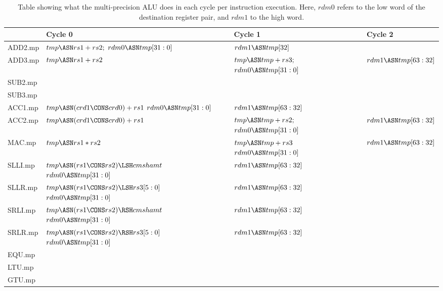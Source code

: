 \documentclass{article}
\begin{document}
\begin{table}[H]
\begin{tabularx}{\textwidth}{l Y Y Y }
\toprule
\textbf{}& \textbf{Cycle 0}& \textbf{Cycle 1}& \textbf{Cycle 2} \\
\midrule
ADD2.mp&
    $tmp \ASN rs1+rs2;$\newline 
    $rdm0\ASN tmp[31:0]$ 
 &  $rdm1\ASN tmp[32]$ 
 & \\
ADD3.mp&
   $tmp \ASN rs1 + rs2$
 & $tmp \ASN tmp + rs3;$\newline
   $rdm0\ASN tmp[31:0]$ 
 & $rdm1\ASN tmp[63:32]$ 
\\
SUB2.mp&
 &
 &
\\
SUB3.mp&
 &
 &
\\
ACC1.mp&
    $tmp \ASN (crd1 \CONS crd0) + rs1$\newline 
    $rdm0\ASN tmp[31:0]$ 
 &  $rdm1\ASN tmp[63:32]$ 
 &
\\
ACC2.mp&
    $tmp \ASN (crd1 \CONS crd0) + rs1$\newline 
 &  $tmp \ASN tmp + rs2;$\newline 
    $rdm0\ASN tmp[31:0]$ 
 &  $rdm1\ASN tmp[63:32]$ 
\\
MAC.mp &
    $tmp \ASN rs1 * rs2$ \newline 
 &  
    $tmp \ASN tmp + rs3$\newline 
    $rdm0\ASN tmp[31:0]$ 
 &  $rdm1\ASN tmp[63:32]$ 
\\
SLLI.mp&
    $tmp \ASN (rs1 \CONS rs2) \LSH cmshamt$\newline 
    $rdm0\ASN tmp[31:0]$ 
 &  $rdm1\ASN tmp[63:32]$ 
 &
\\
SLLR.mp&
    $tmp \ASN (rs1 \CONS rs2) \LSH rs3[5:0]$\newline 
    $rdm0\ASN tmp[31:0]$ 
 &  $rdm1\ASN tmp[63:32]$ 
 &
\\
SRLI.mp&
    $tmp \ASN (rs1 \CONS rs2) \RSH cmshamt$\newline 
    $rdm0\ASN tmp[31:0]$ 
 &  $rdm1\ASN tmp[63:32]$ 
 &
\\
SRLR.mp&
    $tmp \ASN (rs1 \CONS rs2) \RSH rs3[5:0]$\newline 
    $rdm0\ASN tmp[31:0]$ 
 &  $rdm1\ASN tmp[63:32]$ 
 &
\\
EQU.mp &
 &
 &
\\
LTU.mp &
 &
 &
\\
GTU.mp &
 &
 &
\\
\bottomrule
\end{tabularx}
\caption{Table showing what the multi-precision ALU does in each cycle
per instruction execution. Here, $rdm0$ refers to the low word of the
destination register pair, and $rdm1$ to the high word.}
\label{tab:mp-alu-exec}
\end{table}
\end{document}
